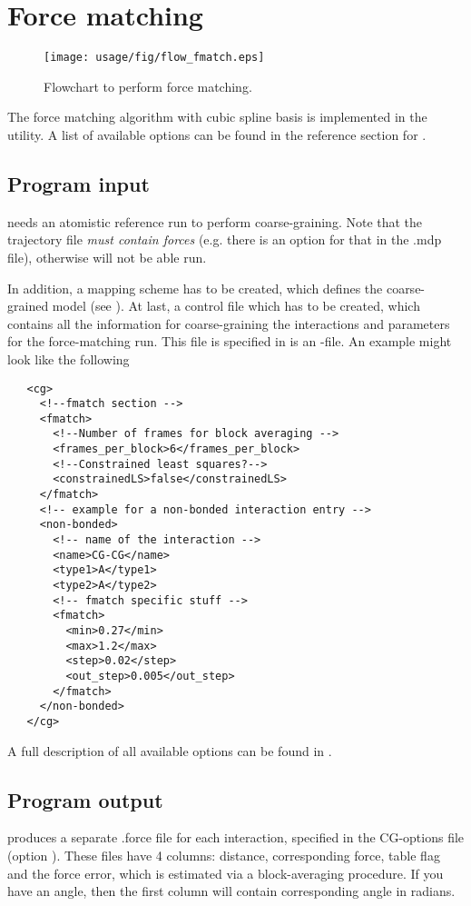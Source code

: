 \chapter{Force matching}
\begin{figure}
   \centering
   \texttt{[image: usage/fig/flow\_fmatch.eps]}
   \caption{Flowchart to perform force matching.}
\end{figure}
The force matching algorithm with cubic spline basis is implemented in the  utility. A list of available options can be found in the reference section for .

\section{Program input}
 needs an atomistic reference run to perform coarse-graining. Note that the trajectory file {\em must contain forces } (e.g. there is an option for that in the \gromacs .mdp file), otherwise  will not be able run.

In addition, a mapping scheme has to be created, which defines the coarse-grained model (see ). At last, a control file which has to be created, which contains all the information for coarse-graining the interactions and parameters for the force-matching run. This file is specified in  is an \xml-file. An example might look like the following
\begin{lstlisting}
   <cg>
     <!--fmatch section -->
     <fmatch>
       <!--Number of frames for block averaging -->
       <frames_per_block>6</frames_per_block>
       <!--Constrained least squares?-->
       <constrainedLS>false</constrainedLS>
     </fmatch>
     <!-- example for a non-bonded interaction entry -->
     <non-bonded>
       <!-- name of the interaction -->
       <name>CG-CG</name>
       <type1>A</type1>
       <type2>A</type2>
       <!-- fmatch specific stuff -->
       <fmatch>
         <min>0.27</min>
         <max>1.2</max>
         <step>0.02</step>
         <out_step>0.005</out_step>
       </fmatch>
     </non-bonded>
   </cg>
\end{lstlisting}
A full description of all available options can be found in .

\section{Program output}
 produces a separate .force file for each interaction, specified in the CG-options file (option  ).
These files have 4 columns: distance, corresponding force, table flag and the force error, which is estimated via a block-averaging procedure.
If you have an angle, then the first column will contain corresponding angle in radians.

